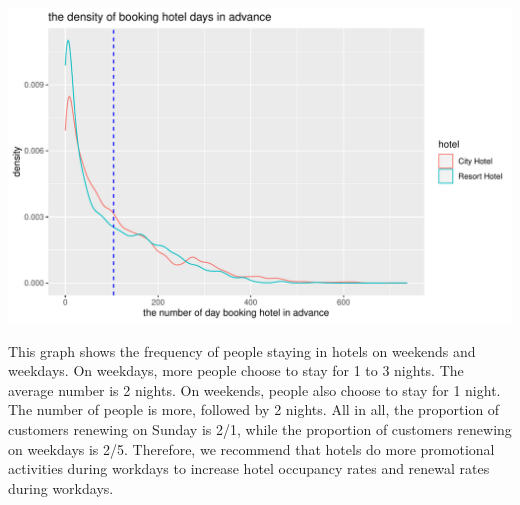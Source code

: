 \documentclass[11pt,a4paper,]{article}
\begin{document}
\includegraphics{tidy_files/figure-latex/leadtime-1.pdf}

This graph shows the frequency of people staying in hotels on weekends and weekdays. On weekdays, more people choose to stay for 1 to 3 nights. The average number is 2 nights. On weekends, people also choose to stay for 1 night. The number of people is more, followed by 2 nights. All in all, the proportion of customers renewing on Sunday is 2/1, while the proportion of customers renewing on weekdays is 2/5.
Therefore, we recommend that hotels do more promotional activities during workdays to increase hotel occupancy rates and renewal rates during workdays.
\end{document}
